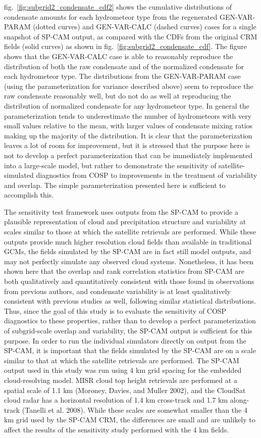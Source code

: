 fig.~\ref{fig:subgrid2_condensate_cdf2} shows the cumulative
distributions of condensate amounts for each hydrometeor type from the
regenerated GEN-VAR-PARAM (dotted curves) and GEN-VAR-CALC (dashed
curves) cases for a single snapshot of SP-CAM output, as compared with
the CDFs from the original CRM fields (solid curves) as shown in
fig.~\ref{fig:subgrid2_condensate_cdf}. The figure shows that the
GEN-VAR-CALC case is able to reasonably reproduce the distribution of
both the raw condensate and of the normalized condensate for each
hydrometeor type. The distributions from the GEN-VAR-PARAM case (using
the parameterization for variance described above) seem to reproduce the
raw condensate reasonably well, but do not do as well at reproducing the
distribution of normalized condensate for any hydrometeor type. In
general the parameterization tends to underestimate the number of
hydrometeors with very small values relative to the mean, with larger
values of condensate mixing ratios making up the majority of the
distribution. It is clear that the parameterization leaves a lot of room
for improvement, but it is stressed that the purpose here is not to
develop a perfect parameterization that can be immediately implemented
into a large-scale model, but rather to demonstrate the sensitivity of
satellite-simulated diagnostics from COSP to improvements in the
treatment of variability and overlap. The simple parameterization
presented here is sufficient to accomplish this.

The sensitivity test framework uses outputs from the SP-CAM to provide a
plausible representation of cloud and precipitation structure and
variability at scales similar to those at which the satellite retrievals
are performed. While these outputs provide much higher resolution cloud
fields than available in traditional GCMs, the fields simulated by the
SP-CAM are in fact still model outputs, and may not perfectly simulate
any observed cloud systems. Nonetheless, it has been shown here that the
overlap and rank correlation statistics from SP-CAM are both
qualitatively and quantitatively consistent with those found in
observations from previous authors, and condensate variability is at
least qualitatively consistent with previous studies as well, following
similar statistical distributions. Thus, since the goal of this study is
to evaluate the sensitivity of COSP diagnostics to these properties,
rather than to develop a perfect parameterization of subgrid-scale
overlap and variability, the SP-CAM output is sufficient for this
purpose. In order to run the individual simulators directly on output
from the SP-CAM, it is important that the fields simulated by the SP-CAM
are on a scale similar to that at which the satellite retrievals are
performed. The SP-CAM output used in this study was run using 4 km grid
spacing for the embedded cloud-resolving model. MISR cloud top height
retrievals are performed at a spatial scale of 1.1 km (Moroney, Davies,
and Muller 2002), and the CloudSat cloud radar has a horizontal
resolution of 1.4 km cross-track and 1.7 km along-track (Tanelli et al.
2008). While these scales are somewhat smaller than the 4 km grid used
by the SP-CAM CRM, the differences are small and are unlikely to affect
the results of the sensitivity study performed with the 4 km fields.

